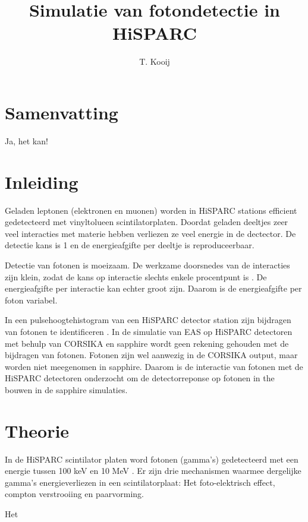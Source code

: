 \documentclass[a4paper,11pt]{article}
\author{T. Kooij}
\title{Simulatie van fotondetectie in HiSPARC}
\begin{document}
\maketitle
\tableofcontents

\section{Samenvatting}
Ja, het kan!

\section{Inleiding}
Geladen leptonen (elektronen en muonen) worden in HiSPARC stations efficient gedetecteerd met vinyltolueen scintilatorplaten. Doordat geladen deeltjes zeer veel interacties met materie hebben verliezen ze veel energie in de dectector. De detectie kans is 1 en de energieafgifte per deeltje is reproduceerbaar.

Detectie van fotonen is moeizaam. De werkzame doorsnedes van de interacties zijn klein, zodat de kans op interactie slechts enkele procentpunt is \citep*{Pennink:2010}. De energieafgifte per interactie kan echter groot zijn. Daarom is de energieafgifte per foton variabel.

In een pulsehoogtehistogram van een HiSPARC detector station zijn bijdragen van fotonen te identificeren \citep*{Pennink:2010}. In de simulatie van EAS op HiSPARC detectoren met behulp van CORSIKA en sapphire wordt geen rekening gehouden met de bijdragen van fotonen. Fotonen zijn wel aanwezig in de CORSIKA output, maar worden niet meegenomen in sapphire. Daarom is de interactie van fotonen met de HiSPARC detectoren onderzocht om de detectorreponse op fotonen in the bouwen in de sapphire simulaties.

\section{Theorie}
In de HiSPARC scintilator platen word fotonen (gamma's) gedetecteerd met een energie tussen 100 keV en 10 MeV \citep*{Steijger2010-gammas}. Er zijn drie mechanismen waarmee dergelijke gamma's energieverliezen in een scintilatorplaat: Het foto-elektrisch effect, compton verstrooiing en paarvorming.

Het






{}

\end{document}
